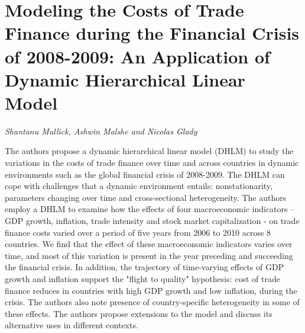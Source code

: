 \documentclass[../booklet.tex]{subfiles}
\begin{document}
\section[Modeling the Costs of Trade Finance during the Financial Crisis of 2008-2009: An Application of Dynamic Hierarchical Linear Model. {\it Shantanu Mullick, Ashwin Malshe and Nicolas Glady}]{Modeling the Costs of Trade Finance during the Financial Crisis of 2008-2009: An Application of Dynamic Hierarchical Linear Model}
  

\begin{center}
  {\it Shantanu Mullick, Ashwin Malshe and Nicolas Glady}
\end{center}

\vskip 0.8cm

The authors propose a dynamic hierarchical linear model (DHLM) to study the variations in the costs of trade finance over time and across countries in dynamic environments such as the global financial crisis of 2008-2009. The DHLM can cope with challenges that a dynamic environment entails: nonstationarity, parameters changing over time and cross-sectional heterogeneity. The authors employ a DHLM to examine how the effects of four macroeconomic indicators -- GDP growth, inflation, trade intensity and stock market capitalization - on trade finance costs varied over a period of five years from 2006 to 2010 across 8 countries. We find that the effect of these macroeconomic indicators varies over time, and most of this variation is present in the year preceding and succeeding the financial crisis. In addition, the trajectory of time-varying effects of GDP growth and inflation support the "flight to quality" hypothesis: cost of trade finance reduces in countries with high GDP growth and low inflation, during the crisis. The authors also note presence of country-specific heterogeneity in some of these effects. The authors propose extensions to the model and discuss its alternative uses in different contexts.

\end{document}
